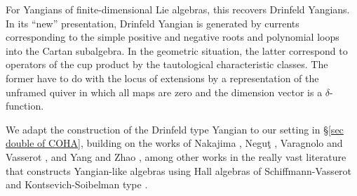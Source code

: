 \documentclass[10pt]{amsart}
\theoremstyle{definition}
\numberwithin{equation}{section}
\begin{document}
For Yangians
of finite-dimensional Lie algebras, this recovers Drinfeld
Yangians. In its ``new'' presentation, Drinfeld Yangian is generated
by currents corresponding to the simple positive and negative
roots and polynomial loops into the Cartan subalgebra. In the
geometric situation, the latter correspond to operators of the
cup product by the tautological characteristic classes. The 
former have to do with the locus of extensions by a representation
of the unframed quiver  in which all maps are zero and the dimension
vector is a $\delta$-function. 

We adapt the construction of the
Drinfeld type Yangian to our setting in \S \ref{sec double of COHA}, building on
the works of Nakajima \cite{Nak1}, Negu\c t \cite{N2}, 
Varagnolo and Vasserot \cite{VV1, VV2}, and Yang and Zhao \cite{YZ},
among other works in the really vast literature that constructs
Yangian-like algebras using Hall algebras of Schiffmann-Vasserot \cite{SV0} and
Kontsevich-Soibelman type \cite{CoHA}. 

\end{document}
